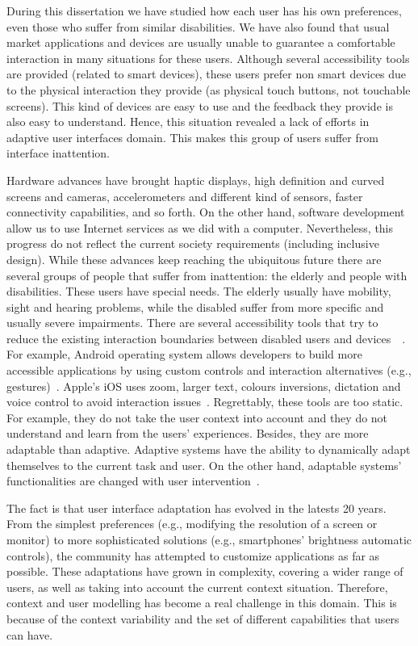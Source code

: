 During this dissertation we have studied how each user has his own preferences,
even those who suffer from similar disabilities. We have also found that usual 
market applications and devices are usually unable to guarantee a comfortable 
interaction in many situations for these users. Although several accessibility 
tools are provided (related to smart devices), these users prefer non smart 
devices due to the physical interaction they provide (as physical touch 
buttons, not touchable screens). This kind of devices are easy to use and the 
feedback they provide is also easy to understand. Hence, this situation 
revealed a lack of efforts in adaptive user interfaces domain. This makes this 
group of users suffer from interface inattention.

Hardware advances have brought haptic displays, high definition and curved 
screens and cameras, accelerometers and different kind of sensors, faster 
connectivity capabilities, and so forth. On the other hand, software development
allow us to use Internet services as we did with a computer. Nevertheless,
this progress do not reflect the current society requirements (including
inclusive design). While these advances keep reaching the ubiquitous future
there are several groups of people that suffer from inattention: the elderly and
people with disabilities. These users have special needs. The elderly usually
have mobility, sight and hearing problems, while the disabled suffer from more
specific and usually severe impairments. There are several accessibility tools
that try to reduce the existing interaction boundaries between disabled users
and devices~\citep{gregor_designing_2002}~\citep{burgstahler_designing_2002}.
For example, Android operating system allows developers to build more accessible 
applications by using custom controls and interaction alternatives (e.g.,
gestures)~\citep{android_accessibility}. Apple's iOS uses zoom, larger text,
colours inversions, dictation and voice control to avoid interaction
issues~\citep{ios_accessibility}. Regrettably, these tools are too static. For
example, they do not take the user context into account and they do not understand
and learn from the users' experiences. Besides, they are more adaptable than 
adaptive. Adaptive systems have the ability to dynamically adapt themselves to 
the current task and user. On the other hand, adaptable systems' functionalities 
are changed with user intervention~\citep{fischer_user_2001}.

The fact is that user interface adaptation has evolved in the latests 20 years.
From the simplest preferences (e.g., modifying the resolution of a screen or
monitor) to more sophisticated solutions (e.g., smartphones' brightness automatic
controls), the community has attempted to customize applications as far as 
possible. These adaptations have grown in complexity, covering a wider range of 
users, as well as taking into account the current context situation. Therefore, 
context and user modelling has become a real challenge in this domain. This is 
because of the context variability and the set of different capabilities that 
users can have.

